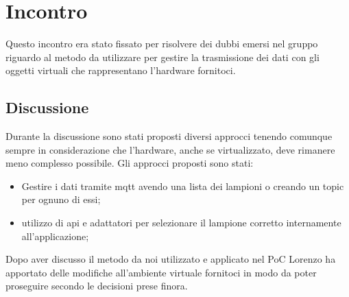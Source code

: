 \section{Incontro}

Questo incontro era stato fissato per risolvere dei dubbi emersi nel gruppo riguardo al metodo da utilizzare per gestire la trasmissione dei dati con gli oggetti virtuali che rappresentano l'hardware fornitoci.

\subsection{Discussione}
Durante la discussione sono stati proposti diversi approcci tenendo comunque sempre in considerazione che l'hardware, anche se virtualizzato, deve rimanere meno complesso possibile.
Gli approcci proposti sono stati:
\begin{itemize}
    \item Gestire i dati tramite mqtt avendo una lista dei lampioni o creando un topic per ognuno di essi;
    \item utilizzo di api e adattatori per selezionare il lampione corretto internamente all'applicazione;
\end{itemize}
Dopo aver discusso il metodo da noi utilizzato e applicato nel PoC Lorenzo ha apportato delle modifiche all'ambiente virtuale fornitoci in modo da poter proseguire secondo le decisioni prese finora.